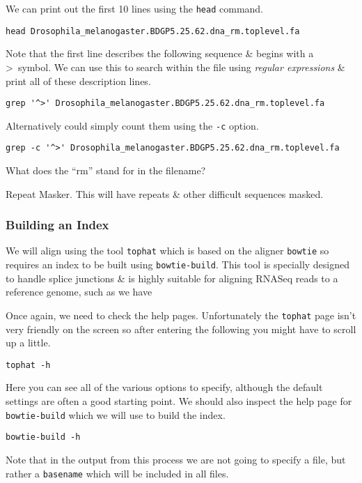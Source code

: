 \begin{steps}
We can print out the first 10 lines using the \texttt{head} command.
\begin{lstlisting}
head Drosophila_melanogaster.BDGP5.25.62.dna_rm.toplevel.fa    
\end{lstlisting}
Note that the first line describes the following sequence \& begins with a \textgreater ~symbol.
We can use this to search within the file using \textit{regular expressions} \& print all of these description lines.
\begin{lstlisting}
grep '^>' Drosophila_melanogaster.BDGP5.25.62.dna_rm.toplevel.fa
\end{lstlisting}
Alternatively could simply count them using the \texttt{-c} option.
\begin{lstlisting}
grep -c '^>' Drosophila_melanogaster.BDGP5.25.62.dna_rm.toplevel.fa  
\end{lstlisting}
\end{steps}

\begin{questions}
What does the ``rm'' stand for in the filename?\\
\begin{answer}
Repeat Masker. This will have repeats \& other difficult sequences masked.
\end{answer}
\end{questions}

\subsubsection{Building an Index}
We will align using the tool \texttt{tophat} which is based on the aligner \texttt{bowtie} so requires an index to be built using \texttt{bowtie-build}. 
This tool is specially designed to handle splice junctions \& is highly suitable for aligning RNASeq reads to a reference genome, such as we have\\

\begin{steps}
Once again, we need to check the help pages.
Unfortunately the \texttt{tophat} page isn't very friendly on the screen so after entering the following you might have to scroll up a little.
\begin{lstlisting}
tophat -h
\end{lstlisting}
Here you can see all of the various options to specify, although the default settings are often a good starting point.
We should also inspect the help page for \texttt{bowtie-build} which we will use to build the index.
\begin{lstlisting}
bowtie-build -h
\end{lstlisting}
Note that in the output from this process we are not going to specify a file, but rather a \texttt{basename} which will be included in all files.
\end{steps}

